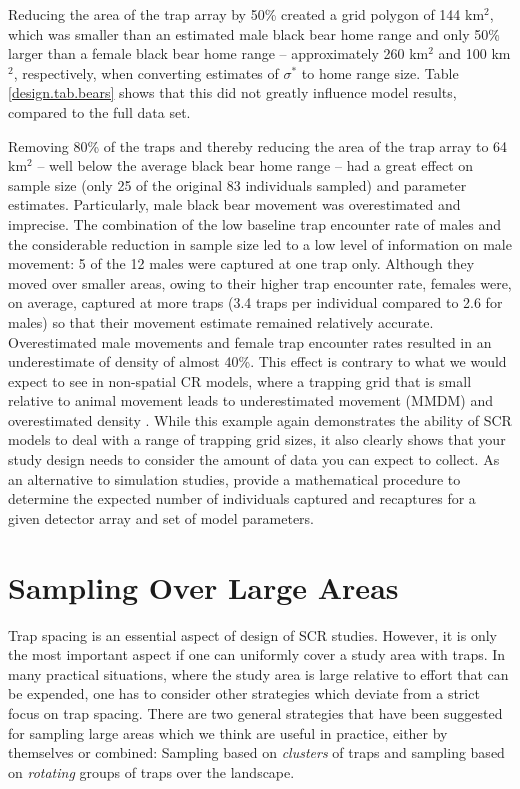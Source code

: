 Reducing the area of the trap array by 50\% created a grid polygon of
144 km$^2$, which was smaller than an estimated male black bear home
range and only 50\% larger than a female black bear home range --
approximately 260 km$^2$ and 100 km$^2$, respectively, when converting
estimates of $\sigma^*$ to home range size. Table
\ref{design.tab.bears} shows that this did not greatly influence model
results, compared to the full data set.


Removing 80\% of the traps and thereby
reducing the area of the trap array to 64 km$^2$ -- well below the
average black bear home range -- had a great effect on sample size
(only 25 of the original 83 individuals sampled) and parameter
estimates. Particularly, male black bear movement was overestimated
and imprecise. The combination of the low baseline trap encounter rate
of males and the considerable reduction in sample size led to a low
level of information on male movement: 5 of the 12 males were captured
at one trap only. Although they moved over smaller areas, owing to
their higher trap encounter rate, females were, on average, captured at
more traps (3.4 traps per individual compared to 2.6 for males) so
that their movement estimate remained relatively
accurate. Overestimated male movements and female trap encounter rates
resulted in an underestimate of density of almost 40\%. This effect
is contrary to what we would expect to see in non-spatial CR models,
where a trapping grid that is small relative to animal movement
leads to underestimated movement (MMDM) and
overestimated density \citep{bondrup-nielsen:1983, dillon_kelly:2007,
  maffei_noss:2008}. While this example again demonstrates the ability
of SCR models to deal with a range of trapping grid sizes, it also
clearly shows that your study design needs to consider the amount of
data you can expect to collect. As an alternative to simulation studies, \citet{efford_etal:2009ecol} provide a mathematical procedure to
determine the expected number of individuals captured and recaptures
for a given detector array and set of model parameters.


\section{Sampling Over Large Areas}
\label{sec.design.large}

Trap spacing is an essential aspect of design of SCR studies. However,
it is only the most important aspect if one can uniformly cover a
study area with traps.   In many practical situations, where the study
area is large relative to effort that can be expended, one has to
consider other strategies which deviate from a strict focus on trap
spacing. There are two general strategies that have been suggested for
sampling large areas
which we think are useful in practice, either by themselves or
combined: Sampling based on {\it clusters} of traps and sampling based
on {\it rotating} groups of traps over the landscape.

